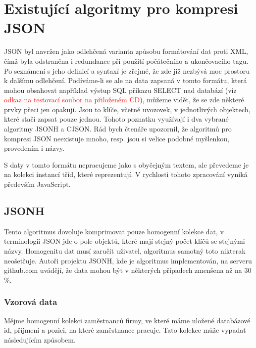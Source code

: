 \chapter{Existující algoritmy pro kompresi JSON}



\label{kapitolaSpecifickeAlgoritmy}

JSON byl navržen jako odlehčená varianta způsobu formátování dat proti XML, čímž byla odstraněna i redundance při použití počátečního a ukončovacího tagu. Po seznámení s jeho definicí a syntaxí je zřejmé, že zde již nezbývá moc prostoru k dalšímu odlehčení. Podíváme-li se ale na data zapsaná v tomto formátu, která mohou obsahovat například výstup SQL příkazu SELECT nad databází (viz \textcolor{red}{odkaz na testovací soubor na přiloženém CD}), můžeme vidět, že se zde některé prvky přeci jen opakují. Jsou to klíče, včetně uvozovek, v jednotlivých objektech, které stačí zapsat pouze jednou. Tohoto poznatku využívají i dva vybrané algoritmy JSONH a CJSON. Rád bych čtenáře upozornil, že algoritmů pro kompresi JSON neexistuje mnoho, resp. jsou si velice podobné myšlenkou, provedením i názvy.

S daty v tomto formátu nepracujeme jako s obyčejným textem, ale převedeme je na kolekci instancí tříd, které reprezentují. V rychlosti tohoto zpracování vyniká především JavaScript. 

\section{JSONH}
Tento algoritmus dovoluje komprimovat pouze homogenní kolekce dat, v terminologii JSON jde o pole objektů, které mají stejný počet klíčů se stejnými názvy. Homogenitu dat musí zaručit uživatel, algoritmus samotný toto nikterak neošetřuje. Autoři projektu JSONH, kde je algoritmus implementován, na serveru github.com uvádějí, že data mohou být v některých případech zmenšena až na 30 \%.

\subsection{Vzorová data}
Mějme homogenní kolekci zaměstnanců firmy, ve které máme uložené databázové id, příjmení a pozici, na které zaměstnanec pracuje. Tato kolekce může vypadat následujícím způsobem.

